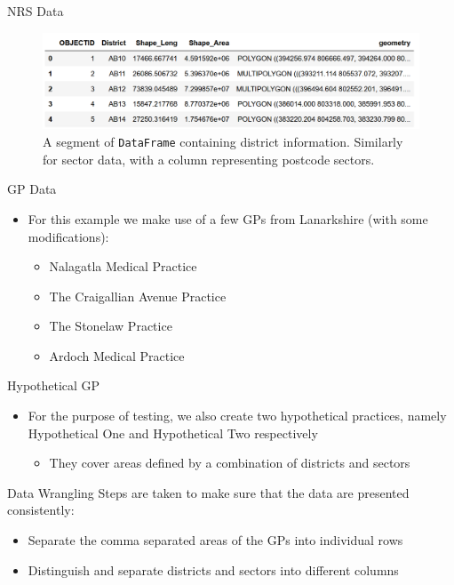 \documentclass[hyperref={breaklinks,colorlinks,
   urlcolor=blue,citecolor=blue,linkcolor=red}]{beamer}
\begin{document}
\begin{frame}{NRS Data}
\begin{figure}
\begin{center}
\includegraphics[scale=0.5]{districtcolumns}
\caption{A segment of \texttt{DataFrame} containing district information. Similarly for sector data, with a column
representing postcode sectors.}
\end{center}
\end{figure}
\end{frame}

\begin{frame}{GP Data}
\begin{itemize}
\item{For this example we make use of a few GPs from Lanarkshire (with some modifications):}
\begin{itemize}
\item{Nalagatla Medical Practice}
\item{The Craigallian Avenue Practice}
\item{The Stonelaw Practice}
\item{Ardoch Medical Practice}
\end{itemize}
\end{itemize}
\end{frame}

\begin{frame}{Hypothetical GP}
\begin{itemize}
\item{For the purpose of testing, we also create two hypothetical practices, namely Hypothetical One and Hypothetical Two respectively}
\begin{itemize}
\item{They cover areas defined by a combination of districts and sectors}
\end{itemize}
\end{itemize}
\end{frame}

\begin{frame}{Data Wrangling}
Steps are taken to make sure that
the data are presented consistently:
\begin{itemize}
\item{Separate the comma separated areas of the GPs into
individual rows}
\item{Distinguish and separate districts and sectors into different columns}
\end{itemize}
\end{frame}
\end{document}
